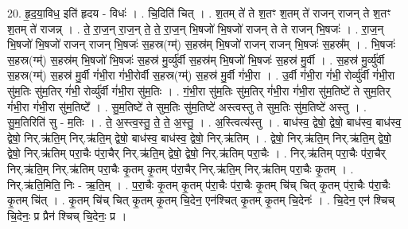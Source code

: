 \documentclass[17pt]{extarticle}
\begin{document}
20. हृ॒द॒या॒विध॒ इति॑ हृदय - विधः॑ । . चि॒दिति॑ चित् । . श॒तम् ते॑ ते श॒तꣳ श॒तम् ते॑ राजन् राजन् ते श॒तꣳ श॒तम् ते॑ राजन्न् । . ते॒ रा॒ज॒न् रा॒ज॒न् ते॒ ते॒ रा॒ज॒न् भि॒षजो॑ भि॒षजो॑ राजन् ते ते राजन् भि॒षजः॑ । . रा॒ज॒न् भि॒षजो॑ भि॒षजो॑ राजन् राजन् भि॒षजः॑ स॒हस्र(ग्म्॑) स॒हस्र॑म् भि॒षजो॑ राजन् राजन् भि॒षजः॑ स॒हस्र᳚म् । . भि॒षजः॑ स॒हस्र(ग्म्॑) स॒हस्र॑म् भि॒षजो॑ भि॒षजः॑ स॒हस्र॑ मु॒र्व्यु॑र्वी स॒हस्र॑म् भि॒षजो॑ भि॒षजः॑ स॒हस्र॑ मु॒र्वी । . स॒हस्र॑ मु॒र्व्यु॑र्वी स॒हस्र(ग्म्॑) स॒हस्र॑ मु॒र्वी गं॑भी॒रा गं॑भी॒रोर्वी स॒हस्र(ग्म्॑) स॒हस्र॑ मु॒र्वी गं॑भी॒रा । . उ॒र्वी गं॑भी॒रा गं॑भी॒ रोर्व्यु॑र्वी गं॑भी॒रा सु॑म॒तिः सु॑म॒तिर् गं॑भी॒ रोर्व्यु॑र्वी गं॑भी॒रा सु॑म॒तिः । . गं॒भी॒रा सु॑म॒तिः सु॑म॒तिर् गं॑भी॒रा गं॑भी॒रा सु॑म॒तिष्टे॑ ते सुम॒तिर् गं॑भी॒रा गं॑भी॒रा सु॑म॒तिष्टे᳚ । . सु॒म॒तिष्टे॑ ते सुम॒तिः सु॑म॒तिष्टे॑ अस्त्वस्तु ते सुम॒तिः सु॑म॒तिष्टे॑ अस्तु । . सु॒म॒तिरिति॑ सु - म॒तिः । . ते॒ अ॒स्त्व॒स्तु॒ ते॒ ते॒ अ॒स्तु॒ । . अ॒स्त्वित्य॑स्तु । . बाध॑स्व॒ द्वेषो॒ द्वेषो॒ बाध॑स्व॒ बाध॑स्व॒ द्वेषो॒ निर्.ऋ॑ति॒म् निर्.ऋ॑ति॒म् द्वेषो॒ बाध॑स्व॒ बाध॑स्व॒ द्वेषो॒ निर्.ऋ॑तिम् । . द्वेषो॒ निर्.ऋ॑ति॒म् निर्.ऋ॑ति॒म् द्वेषो॒ द्वेषो॒ निर्.ऋ॑तिम् परा॒चैः प॑रा॒चैर् निर्.ऋ॑ति॒म् द्वेषो॒ द्वेषो॒ निर्.ऋ॑तिम् परा॒चैः । . निर्.ऋ॑तिम् परा॒चैः प॑रा॒चैर् निर्.ऋ॑ति॒म् निर्.ऋ॑तिम् परा॒चैः कृ॒तम् कृ॒तम् प॑रा॒चैर् निर्.ऋ॑ति॒म् निर्.ऋ॑तिम् परा॒चैः कृ॒तम् । . निर्.ऋ॑ति॒मिति॒ निः - ऋ॒ति॒म् । . प॒रा॒चैः कृ॒तम् कृ॒तम् प॑रा॒चैः प॑रा॒चैः कृ॒तम् चि॑च् चित् कृ॒तम् प॑रा॒चैः प॑रा॒चैः कृ॒तम् चि॑त् । . कृ॒तम् चि॑च् चित् कृ॒तम् कृ॒तम् चि॒देन॒ एन॑श्चित् कृ॒तम् कृ॒तम् चि॒देनः॑ । . चि॒देन॒ एन॑ श्चिच् चि॒देनः॒ प्र प्रैन॑ श्चिच् चि॒देनः॒ प्र । \newline
\end{document}
